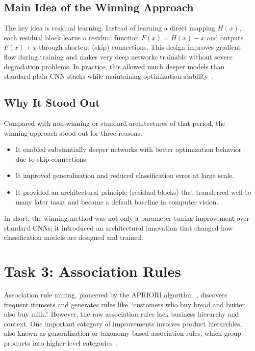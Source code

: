 \documentclass[runningheads]{llncs}
\begin{document}
\subsection*{Main Idea of the Winning Approach}
The key idea is residual learning. Instead of learning a direct mapping $H(x)$, each residual block learns a residual function $F(x)=H(x)-x$ and outputs $F(x)+x$ through shortcut (skip) connections. This design improves gradient flow during training and makes very deep networks trainable without severe degradation problems. In practice, this allowed much deeper models than standard plain CNN stacks while maintaining optimization stability~\cite{he_2016}.

\subsection*{Why It Stood Out}
Compared with non-winning or standard architectures of that period, the winning approach stood out for three reasons:
\begin{itemize}
\item It enabled substantially deeper networks with better optimization behavior due to skip connections.
\item It improved generalization and reduced classification error at large scale.
\item It provided an architectural principle (residual blocks) that transferred well to many later tasks and became a default baseline in computer vision.
\end{itemize}

In short, the winning method was not only a parameter tuning improvement over standard CNNs; it introduced an architectural innovation that changed how classification models are designed and trained.


\section{Task 3: Association Rules}

Association rule mining, pioneered by the APRIORI algorithm~\cite{agrawal_1994}, discovers frequent itemsets and generates rules like ``customers who buy bread and butter also buy milk.'' However, the raw association rules lack business hierarchy and context. One important category of improvements involves product hierarchies, also known as generalization or taxonomy-based association rules, which group products into higher-level categories~\cite{srikant_1997}.
\end{document}
